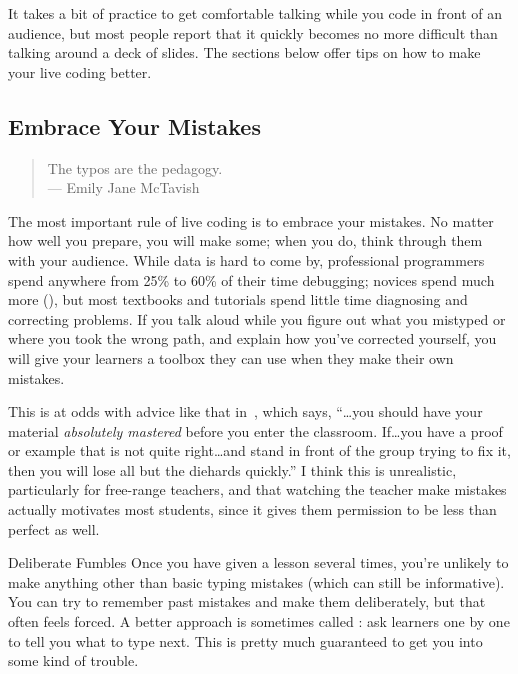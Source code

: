It takes a bit of practice to get comfortable
talking while you code in front of an audience,
but most people report that it quickly becomes no more difficult than talking around a deck of slides.
The sections below offer tips on how to make your live coding better.

\subsection*{Embrace Your Mistakes}

\begin{quote}

  The typos are the pedagogy. \\
  --- Emily Jane McTavish

\end{quote}

The most important rule of live coding is to embrace your mistakes.
No matter how well you prepare,
you will make some;
when you do,
think through them with your audience.
While data is hard to come by,
professional programmers spend anywhere from 25\% to 60\% of their time debugging;
novices spend much more (),
but most textbooks and tutorials spend little time diagnosing and correcting problems.
If you talk aloud while you figure out what you mistyped
or where you took the wrong path,
and explain how you've corrected yourself,
you will give your learners a toolbox they can use when they make their own mistakes.

This is at odds with advice like that in~\cite{Kran2015},
which says,
``{\ldots}you should have your material \emph{absolutely mastered} before you enter the classroom.
If{\ldots}you have a proof or example that is not quite right{\ldots}and stand in front of the group trying to fix it,
then you will lose all but the diehards quickly.''
I think this is unrealistic,
particularly for free-range teachers,
and that watching the teacher make mistakes actually motivates most students,
since it gives them permission to be less than perfect as well.

\begin{aside}{Deliberate Fumbles}
  Once you have given a lesson several times,
  you're unlikely to make anything other than basic typing mistakes
  (which can still be informative).
  You can try to remember past mistakes and make them deliberately,
  but that often feels forced.
  A better approach is sometimes called :
  ask learners one by one to tell you what to type next.
  This is pretty much guaranteed to get you into some kind of trouble.
\end{aside}


